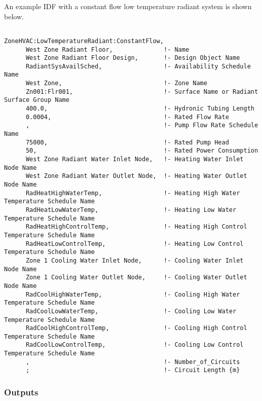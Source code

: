 An example IDF with a constant flow low temperature radiant system is shown below.

\begin{lstlisting}

ZoneHVAC:LowTemperatureRadiant:ConstantFlow,
      West Zone Radiant Floor,              !- Name
      West Zone Radiant Floor Design,       !- Design Object Name
      RadiantSysAvailSched,                 !- Availability Schedule Name
      West Zone,                            !- Zone Name
      Zn001:Flr001,                         !- Surface Name or Radiant Surface Group Name
      400.0,                                !- Hydronic Tubing Length
      0.0004,                               !- Rated Flow Rate
      ,                                     !- Pump Flow Rate Schedule Name
      75000,                                !- Rated Pump Head
      50,                                   !- Rated Power Consumption
      West Zone Radiant Water Inlet Node,   !- Heating Water Inlet Node Name
      West Zone Radiant Water Outlet Node,  !- Heating Water Outlet Node Name
      RadHeatHighWaterTemp,                 !- Heating High Water Temperature Schedule Name
      RadHeatLowWaterTemp,                  !- Heating Low Water Temperature Schedule Name
      RadHeatHighControlTemp,               !- Heating High Control Temperature Schedule Name
      RadHeatLowControlTemp,                !- Heating Low Control Temperature Schedule Name
      Zone 1 Cooling Water Inlet Node,      !- Cooling Water Inlet Node Name
      Zone 1 Cooling Water Outlet Node,     !- Cooling Water Outlet Node Name
      RadCoolHighWaterTemp,                 !- Cooling High Water Temperature Schedule Name
      RadCoolLowWaterTemp,                  !- Cooling Low Water Temperature Schedule Name
      RadCoolHighControlTemp,               !- Cooling High Control Temperature Schedule Name
      RadCoolLowControlTemp,                !- Cooling Low Control Temperature Schedule Name
      ,                                     !- Number_of_Circuits
      ;                                     !- Circuit Length {m}
\end{lstlisting}


\subsubsection{Outputs}\label{outputs-6-007}

